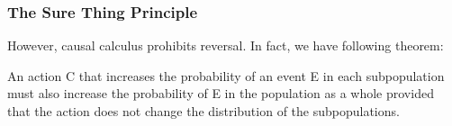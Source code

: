 \documentclass{beamer}
\begin{document}

\begin{frame}
\frametitle{The Sure Thing Principle}
However, causal calculus prohibits reversal. In fact, we have following theorem:
\begin{theorem}
An action C that increases the probability of an event E in each subpopulation must also
increase the probability of E in the population as a whole
provided that the action does not change the distribution of the subpopulations.
\end{theorem}
\end{frame}





\end{document}
